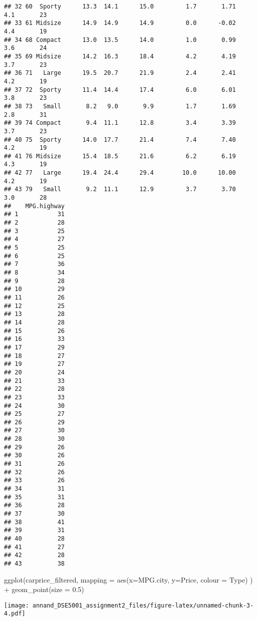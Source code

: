 \documentclass[
]{article}
\newenvironment{Shaded}{\begin{snugshade}}{\end{snugshade}}
\newcommand{\AttributeTok}[1]{\textcolor[rgb]{0.77,0.63,0.00}{#1}}
\newcommand{\FloatTok}[1]{\textcolor[rgb]{0.00,0.00,0.81}{#1}}
\newcommand{\FunctionTok}[1]{\textcolor[rgb]{0.00,0.00,0.00}{#1}}
\newcommand{\NormalTok}[1]{#1}
\newcommand{\SpecialCharTok}[1]{\textcolor[rgb]{0.00,0.00,0.00}{#1}}
\begin{document}
\begin{verbatim}
## 32 60  Sporty      13.3  14.1      15.0         1.7       1.71    4.1       23
## 33 61 Midsize      14.9  14.9      14.9         0.0      -0.02    4.4       19
## 34 68 Compact      13.0  13.5      14.0         1.0       0.99    3.6       24
## 35 69 Midsize      14.2  16.3      18.4         4.2       4.19    3.7       23
## 36 71   Large      19.5  20.7      21.9         2.4       2.41    4.2       19
## 37 72  Sporty      11.4  14.4      17.4         6.0       6.01    3.8       23
## 38 73   Small       8.2   9.0       9.9         1.7       1.69    2.8       31
## 39 74 Compact       9.4  11.1      12.8         3.4       3.39    3.7       23
## 40 75  Sporty      14.0  17.7      21.4         7.4       7.40    4.2       19
## 41 76 Midsize      15.4  18.5      21.6         6.2       6.19    4.3       19
## 42 77   Large      19.4  24.4      29.4        10.0      10.00    4.2       19
## 43 79   Small       9.2  11.1      12.9         3.7       3.70    3.0       28
##    MPG.highway
## 1           31
## 2           28
## 3           25
## 4           27
## 5           25
## 6           25
## 7           36
## 8           34
## 9           28
## 10          29
## 11          26
## 12          25
## 13          28
## 14          28
## 15          26
## 16          33
## 17          29
## 18          27
## 19          27
## 20          24
## 21          33
## 22          28
## 23          33
## 24          30
## 25          27
## 26          29
## 27          30
## 28          30
## 29          26
## 30          26
## 31          26
## 32          26
## 33          26
## 34          31
## 35          31
## 36          28
## 37          30
## 38          41
## 39          31
## 40          28
## 41          27
## 42          28
## 43          38
\end{verbatim}

\begin{Shaded}
\begin{Highlighting}[]
\FunctionTok{ggplot}\NormalTok{(carprice\_filtered,}
       \AttributeTok{mapping =} \FunctionTok{aes}\NormalTok{(}\AttributeTok{x=}\NormalTok{MPG.city, }\AttributeTok{y=}\NormalTok{Price, }\AttributeTok{colour =}\NormalTok{ Type)}
\NormalTok{) }\SpecialCharTok{+} \FunctionTok{geom\_point}\NormalTok{(}\AttributeTok{size =} \FloatTok{0.5}\NormalTok{)}
\end{Highlighting}
\end{Shaded}

\texttt{[image: annand\_DSE5001\_assignment2\_files/figure-latex/unnamed-chunk-3-4.pdf]}
\end{document}
